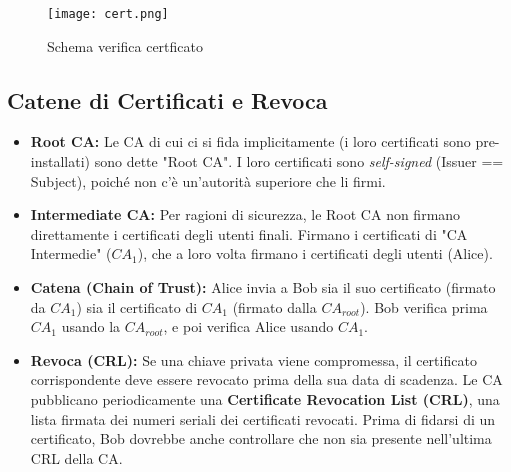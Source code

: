 \documentclass[../main.tex]{subfiles}
\begin{document}
\begin{figure}[H]
  \centering
  \texttt{[image: cert.png]}
  \caption{Schema verifica certficato}
  \label{fig:}
\end{figure}

\subsection{Catene di Certificati e Revoca}
\begin{itemize}
    \item \textbf{Root CA:} Le CA di cui ci si fida implicitamente (i loro certificati sono pre-installati) sono dette "Root CA". I loro certificati sono \emph{self-signed} (Issuer == Subject), poiché non c'è un'autorità superiore che li firmi.
    \item \textbf{Intermediate CA:} Per ragioni di sicurezza, le Root CA non firmano direttamente i certificati degli utenti finali. Firmano i certificati di "CA Intermedie" ($CA_1$), che a loro volta firmano i certificati degli utenti (Alice).
    \item \textbf{Catena (Chain of Trust):} Alice invia a Bob sia il suo certificato (firmato da $CA_1$) sia il certificato di $CA_1$ (firmato dalla $CA_{root}$). Bob verifica prima $CA_1$ usando la $CA_{root}$, e poi verifica Alice usando $CA_1$.
    \item \textbf{Revoca (CRL):} Se una chiave privata viene compromessa, il certificato corrispondente deve essere revocato prima della sua data di scadenza. Le CA pubblicano periodicamente una \textbf{Certificate Revocation List (CRL)}, una lista firmata dei numeri seriali dei certificati revocati. Prima di fidarsi di un certificato, Bob dovrebbe anche controllare che non sia presente nell'ultima CRL della CA.
\end{itemize} 
\end{document}
